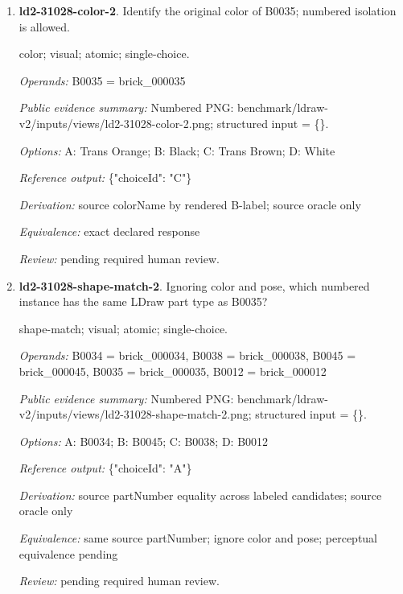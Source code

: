 \begin{enumerate}
\par{\small distance; source-data; atomic; single-choice.\par\textit{Operands:} B0024 = brick\_000024, B0018 = brick\_000018, B0028 = brick\_000028, B0043 = brick\_000043\par\textit{Public evidence summary:} \{"coordinateFrame": "Viewer world, millimeters, Euclidean distance", "centers": \{"B0018": [0, 8.8, -36], "B0028": [0, 15.2, -24], "B0043": [-17.2, -12, 0], "B0024": [-20, 15.2, -56]\}\}\par\textit{Options:} A: B0043; B: B0024; C: B0028\par\textit{Reference output:} \{"choiceId": "C"\}\par\textit{Derivation:} Euclidean norm from public rounded centers\par\textit{Equivalence:} exact declared response\par\textit{Review:} machine checks passed; no human certification.}
\item \textbf{ld2-31028-color-2}. Identify the original color of B0035; numbered isolation is allowed.
\par{\small color; visual; atomic; single-choice.\par\textit{Operands:} B0035 = brick\_000035\par\textit{Public evidence summary:} Numbered PNG: benchmark/ldraw-v2/inputs/views/ld2-31028-color-2.png; structured input = \{\}.\par\textit{Options:} A: Trans Orange; B: Black; C: Trans Brown; D: White\par\textit{Reference output:} \{"choiceId": "C"\}\par\textit{Derivation:} source colorName by rendered B-label; source oracle only\par\textit{Equivalence:} exact declared response\par\textit{Review:} pending required human review.}
\item \textbf{ld2-31028-shape-match-2}. Ignoring color and pose, which numbered instance has the same LDraw part type as B0035?
\par{\small shape-match; visual; atomic; single-choice.\par\textit{Operands:} B0034 = brick\_000034, B0038 = brick\_000038, B0045 = brick\_000045, B0035 = brick\_000035, B0012 = brick\_000012\par\textit{Public evidence summary:} Numbered PNG: benchmark/ldraw-v2/inputs/views/ld2-31028-shape-match-2.png; structured input = \{\}.\par\textit{Options:} A: B0034; B: B0045; C: B0038; D: B0012\par\textit{Reference output:} \{"choiceId": "A"\}\par\textit{Derivation:} source partNumber equality across labeled candidates; source oracle only\par\textit{Equivalence:} same source partNumber; ignore color and pose; perceptual equivalence pending\par\textit{Review:} pending required human review.}

\end{enumerate}
